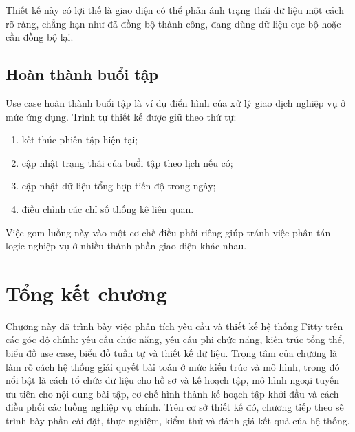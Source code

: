 Thiết kế này có lợi thế là giao diện có thể phản ánh trạng thái dữ liệu một cách rõ ràng, chẳng hạn như đã đồng bộ thành công, đang dùng dữ liệu cục bộ hoặc cần đồng bộ lại.

\subsection{Hoàn thành buổi tập}

Use case hoàn thành buổi tập là ví dụ điển hình của xử lý giao dịch nghiệp vụ ở mức ứng dụng. Trình tự thiết kế được giữ theo thứ tự:

\begin{enumerate}
    \item kết thúc phiên tập hiện tại;
    \item cập nhật trạng thái của buổi tập theo lịch nếu có;
    \item cập nhật dữ liệu tổng hợp tiến độ trong ngày;
    \item điều chỉnh các chỉ số thống kê liên quan.
\end{enumerate}

Việc gom luồng này vào một cơ chế điều phối riêng giúp tránh việc phân tán logic nghiệp vụ ở nhiều thành phần giao diện khác nhau.

\section{Tổng kết chương}

Chương này đã trình bày việc phân tích yêu cầu và thiết kế hệ thống Fitty trên các góc độ chính: yêu cầu chức năng, yêu cầu phi chức năng, kiến trúc tổng thể, biểu đồ use case, biểu đồ tuần tự và thiết kế dữ liệu. Trọng tâm của chương là làm rõ cách hệ thống giải quyết bài toán ở mức kiến trúc và mô hình, trong đó nổi bật là cách tổ chức dữ liệu cho hồ sơ và kế hoạch tập, mô hình ngoại tuyến ưu tiên cho nội dung bài tập, cơ chế hình thành kế hoạch tập khởi đầu và cách điều phối các luồng nghiệp vụ chính. Trên cơ sở thiết kế đó, chương tiếp theo sẽ trình bày phần cài đặt, thực nghiệm, kiểm thử và đánh giá kết quả của hệ thống.








